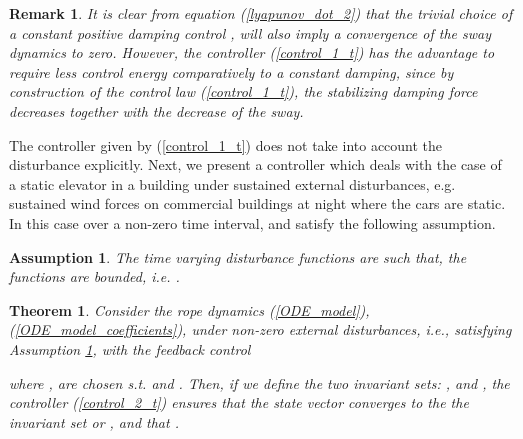 \documentclass[letterpaper, 11 pt, conference]{ieeeconf}
\newtheorem{thm}{\bf Theorem}
\newtheorem{assumption}{Assumption}
\newtheorem{remark}{Remark}
\begin{document}
\begin{remark}
It is clear from equation (\ref{lyapunov_dot_2}) that the trivial
choice of a constant positive damping control , will also imply
a convergence of the sway dynamics to zero. However, the
controller (\ref{control_1_t}) has the advantage to  require less
control energy comparatively to a constant damping, since by
construction of the control law (\ref{control_1_t}), the
stabilizing damping force decreases together with the decrease of
the sway.
\end{remark}

The controller  given by (\ref{control_1_t}) does not take into
account the disturbance  explicitly. Next, we present a
controller which deals with the case of a static elevator in a
building under sustained external disturbances, e.g. sustained
wind forces on commercial buildings at night where the cars are
static. In this case  over a
non-zero time interval, and satisfy the following
assumption.\\
\begin{assumption}\label{assumption0}
The time varying disturbance functions  are such
that, the functions  are bounded, i.e.
.
\end{assumption}
\begin{thm}\label{theorem3}
Consider the rope dynamics (\ref{ODE_model}),
(\ref{ODE_model_coefficients}), under non-zero external
disturbances, i.e.,  satisfying
Assumption \ref{assumption0}, with the feedback control

where , are chosen s.t.
 and
. Then, if we define the two invariant
sets: ,
and
,
the controller (\ref{control_2_t}) ensures that the state vector
 converges to the the invariant set  or , and
that .
\end{thm}
\end{document}
